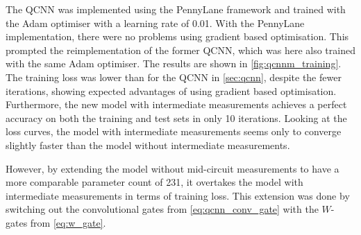 The QCNN was implemented using the PennyLane framework and trained with the Adam optimiser with a learning rate of 0.01.
With the PennyLane implementation, there were no problems using gradient based optimisation.
This prompted the reimplementation of the former QCNN, which was here also trained with the same Adam optimiser.
The results are shown in \cref{fig:qcnnm_training}.
The training loss was lower than for the QCNN in \cref{sec:qcnn}, despite the fewer iterations, showing expected advantages of using gradient based optimisation.
Furthermore, the new model with intermediate measurements achieves a perfect accuracy on both the training and test sets in only 10 iterations.
Looking at the loss curves, the model with intermediate measurements seems only to converge slightly faster than the model without intermediate measurements.

However, by extending the model without mid-circuit measurements to have a more comparable parameter count of 231, it overtakes the model with intermediate measurements in terms of training loss.
This extension was done by switching out the convolutional gates from \cref{eq:qcnn_conv_gate} with the $W$-gates from \cref{eq:w_gate}.

